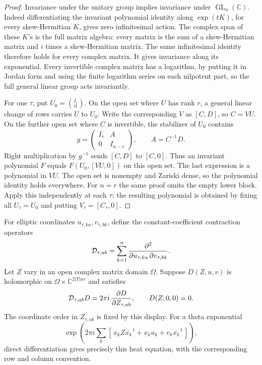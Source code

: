 \begin{proof}
Invariance under the unitary group implies invariance under
\(\operatorname{GL}_n(\mathbb C)\).
Indeed differentiating the invariant polynomial identity
along \(\exp(tK)\), for every skew-Hermitian \(K\), gives
zero infinitesimal action.
The complex span of these \(K\)'s is the full matrix algebra:
every matrix is the sum of a skew-Hermitian matrix and
\(i\) times a skew-Hermitian matrix.
The same infinitesimal identity therefore holds for every
complex matrix.  It gives invariance along its exponential.
Every invertible complex matrix has a logarithm, by putting
it in Jordan form and using the finite logarithm series on
each nilpotent part, so the full general linear group acts
invariantly.

For one \(\tau\), put
\(U_0=\binom{I_r}{0}\).
On the open set where \(U\) has rank \(r\), a general linear
change of rows carries \(U\) to \(U_0\).
Write the corresponding \(V\) as \([C,D]\), so \(C=VU\).
On the further open set where \(C\) is invertible, the
stabilizer of \(U_0\) contains
\[
       g=\begin{pmatrix}I_r&A\\0&I_{n-r}\end{pmatrix},
                   \qquad A=C^{-1}D.
\]
Right multiplication by \(g^{-1}\) sends \([C,D]\) to
\([C,0]\).  Thus an invariant polynomial \(F\) equals
\(F(U_0,[VU,0])\) on this open set.
The last expression is a polynomial in \(VU\).
The open set is nonempty and Zariski dense, so the polynomial
identity holds everywhere.
For \(n=r\) the same proof omits the empty lower block.
Apply this independently at each \(\tau\); the resulting
polynomial is obtained by fixing all \(U_\tau=U_0\) and
putting \(V_\tau=[C_\tau,0]\).
\end{proof}

For elliptic coordinates \(u_{\tau,ka},v_{\tau,bk}\), define
the constant-coefficient contraction operators
\[
 {\cal D}_{\tau,ab}
       =\sum_{k=1}^n
          \frac{\partial^2}
           {\partial u_{\tau,ka}\,\partial v_{\tau,bk}} .
\]
Let \(Z\) vary in an open complex matrix domain \(\Omega\).
Suppose \(D(Z,u,v)\) is holomorphic on
\(\Omega\times\mathbb C^{2|T|nr}\) and satisfies
\begin{equation}\label{eq:sr-exact-heat}
 {\cal D}_{\tau,ab}D
         =2\pi i\,\frac{\partial D}{\partial Z_{\tau,ab}},
                 \qquad D(Z,0,0)=0 .
\end{equation}
The coordinate order in \(Z_{\tau,ab}\) is fixed by this
display.  For a theta exponential
\[
 \exp\!\left(2\pi i\sum_k
       [\,x_kZ\overline{x_k}^{\,t}+x_ku_k+
                                      v_k\overline{x_k}^{\,t}\,]\right),
\]
direct differentiation gives precisely this heat equation,
with the corresponding row and column convention.

